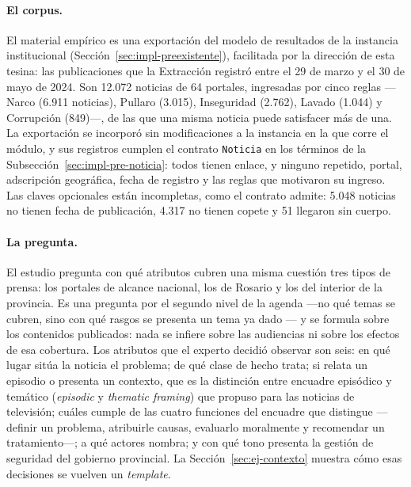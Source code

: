 \documentclass[12pt]{report}
\begin{document}
\paragraph{El corpus.} El material empírico es una exportación del modelo de resultados de la instancia institucional (Sección~\ref{sec:impl-preexistente}), facilitada por la dirección de esta tesina: las publicaciones que la Extracción registró entre el 29 de marzo y el 30 de mayo de 2024. Son 12.072 noticias de 64 portales, ingresadas por cinco reglas ---Narco (6.911 noticias), Pullaro (3.015), Inseguridad (2.762), Lavado (1.044) y Corrupción (849)---, de las que una misma noticia puede satisfacer más de una. La exportación se incorporó sin modificaciones a la instancia en la que corre el módulo, y sus registros cumplen el contrato \texttt{Noticia} en los términos de la Subsección~\ref{sec:impl-pre-noticia}: todos tienen enlace, y ninguno repetido, portal, adscripción geográfica, fecha de registro y las reglas que motivaron su ingreso. Las claves opcionales están incompletas, como el contrato admite: 5.048 noticias no tienen fecha de publicación, 4.317 no tienen copete y 51 llegaron sin cuerpo.

\paragraph{La pregunta.} El estudio pregunta con qué atributos cubren una misma cuestión tres tipos de prensa: los portales de alcance nacional, los de Rosario y los del interior de la provincia. Es una pregunta por el segundo nivel de la agenda ---no qué temas se cubren, sino con qué rasgos se presenta un tema ya dado \citep{mccombs:1997}--- y se formula sobre los contenidos publicados: nada se infiere sobre las audiencias ni sobre los efectos de esa cobertura. Los atributos que el experto decidió observar son seis: en qué lugar sitúa la noticia el problema; de qué clase de hecho trata; si relata un episodio o presenta un contexto, que es la distinción entre encuadre episódico y temático (\textit{episodic} y \textit{thematic framing}) que \citet{iyengar:1991} propuso para las noticias de televisión; cuáles cumple de las cuatro funciones del encuadre que distingue \citet{entman:1993} ---definir un problema, atribuirle causas, evaluarlo moralmente y recomendar un tratamiento---; a qué actores nombra; y con qué tono presenta la gestión de seguridad del gobierno provincial. La Sección~\ref{sec:ej-contexto} muestra cómo esas decisiones se vuelven un \textit{template}.
\end{document}
